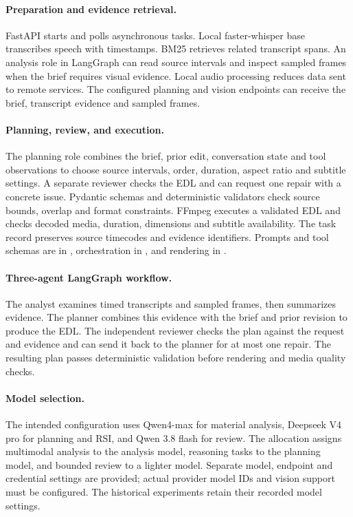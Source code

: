 \paragraph{Preparation and evidence retrieval.}
FastAPI starts and polls asynchronous tasks. Local faster-whisper base \citep{fasterwhisper} transcribes speech with timestamps. BM25 retrieves related transcript spans. An analysis role in LangGraph can read source intervals and inspect sampled frames when the brief requires visual evidence. Local audio processing reduces data sent to remote services. The configured planning and vision endpoints can receive the brief, transcript evidence and sampled frames.

\paragraph{Planning, review, and execution.}
The planning role combines the brief, prior edit, conversation state and tool observations to choose source intervals, order, duration, aspect ratio and subtitle settings. A separate reviewer checks the EDL and can request one repair with a concrete issue. Pydantic schemas and deterministic validators check source bounds, overlap and format constraints. FFmpeg \citep{ffmpeg} executes a validated EDL and checks decoded media, duration, dimensions and subtitle availability. The task record preserves source timecodes and evidence identifiers. Prompts and tool schemas are in , orchestration in , and rendering in .


\paragraph{Three-agent LangGraph workflow.}
The analyst examines timed transcripts and sampled frames, then summarizes evidence. The planner combines this evidence with the brief and prior revision to produce the EDL. The independent reviewer checks the plan against the request and evidence and can send it back to the planner for at most one repair. The resulting plan passes deterministic validation before rendering and media quality checks.

\paragraph{Model selection.}
The intended configuration uses Qwen4-max for material analysis, Deepseek V4 pro for planning and RSI, and Qwen 3.8 flash for review. The allocation assigns multimodal analysis to the analysis model, reasoning tasks to the planning model, and bounded review to a lighter model. Separate model, endpoint and credential settings are provided; actual provider model IDs and vision support must be configured. The historical experiments retain their recorded model settings.


